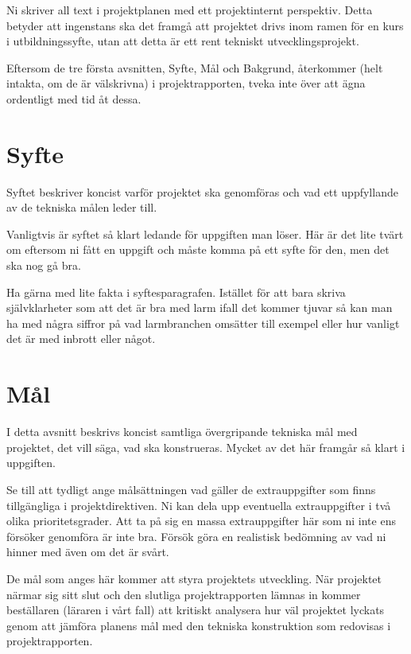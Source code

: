 \documentclass[a4paper]{article}
\begin{document}
Ni skriver all text i projektplanen med ett projektinternt perspektiv.
Detta betyder att ingenstans ska det framgå att projektet drivs inom
ramen för en kurs i utbildningssyfte, utan att detta är ett rent
tekniskt utvecklingsprojekt.

Eftersom de tre första avsnitten, Syfte, Mål och Bakgrund, återkommer
(helt intakta, om de är välskrivna) i projektrapporten, tveka inte över
att ägna ordentligt med tid åt dessa.



\section{Syfte}


Syftet beskriver koncist varför projektet ska genomföras och vad ett
uppfyllande av de tekniska målen leder till.

Vanligtvis är syftet så klart ledande för uppgiften man löser. Här är
det lite tvärt om eftersom ni fått en uppgift och måste komma på ett
syfte för den, men det ska nog gå bra.

Ha gärna med lite fakta i syftesparagrafen. Istället för att bara skriva
självklarheter som att det är bra med larm ifall det kommer tjuvar så
kan man ha med några siffror på vad larmbranchen omsätter till exempel
eller hur vanligt det är med inbrott eller något.



\section{Mål}


I detta avsnitt beskrivs koncist samtliga övergripande tekniska mål med
projektet, det vill säga, vad ska konstrueras. Mycket av det här
framgår så klart i uppgiften.

Se till att tydligt ange målsättningen vad gäller de extrauppgifter som
finns tillgängliga i projektdirektiven. Ni kan dela upp eventuella
extrauppgifter i två olika prioritetsgrader. Att ta på sig en massa
extrauppgifter här som ni inte ens försöker genomföra är inte bra.
Försök göra en realistisk bedömning av vad ni hinner med även om det är
svårt.

De mål som anges här kommer att styra projektets utveckling. När
projektet närmar sig sitt slut och den slutliga projektrapporten lämnas
in kommer beställaren (läraren i vårt fall) att kritiskt analysera hur
väl projektet lyckats genom att jämföra planens mål med den tekniska
konstruktion som redovisas i projektrapporten.
\end{document}
